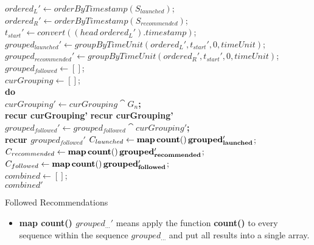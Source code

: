 \documentclass{article}
\begin{document}
\begin{algorithm}[H]
  \SetAlgoLined
  $ordered_{L}' \leftarrow orderByTimestamp(S_{launched})$; \\
  $ordered_{R}' \leftarrow orderByTimestamp(S_{recommended})$; \\
  $t_{start}' \leftarrow convert((head~ordered_{L}').timestamp)$;\\
  $grouped_{launched}' \leftarrow groupByTimeUnit(ordered_{L}',
   t_{start}', 0, timeUnit)$;\\
  $grouped_{recommended}' \leftarrow groupByTimeUnit(ordered_{R}',
   t_{start}', 0, timeUnit)$;\\
  $grouped_{followed} \leftarrow []$;\\
   {$curGrouping \leftarrow []$;\\
     {
       {\bf do \\
         $curGrouping' \leftarrow curGrouping \cat G_{n}$;\\
         recur curGrouping'}
       {\bf recur curGrouping'}}
   {\bf $grouped_{followed}' \leftarrow grouped_{followed} \cat
   curGrouping'$;\\
   recur $grouped_{followed}'$}}
   $C_{launched} \leftarrow {\bf map \, count() \,
     grouped_{launched}'}$;\\
   $C_{recommended} \leftarrow {\bf map \, count() \,
     grouped_{recommended}'}$;\\
   $C_{followed} \leftarrow {\bf map \, count() \,
     grouped_{followed}'}$;\\
   $combined \leftarrow []$;\\
   \Return $combined'$
  \caption{Followed Recommendations}
\end{algorithm}
\begin{itemize}
\item {\bf map count() $grouped_{...}'$} means apply the function {\bf
  count()} to every sequence within the sequence $grouped_{...}$ and
put all results into a single array.
\end{itemize}
\end{document}

